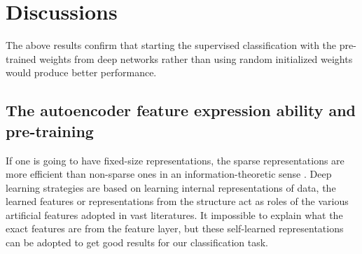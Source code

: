 \documentclass[journal]{IEEEtran}
\begin{document}

\section{Discussions}

The above results confirm that starting the supervised classification with the pre-trained weights from deep networks rather than using random initialized weights would produce better performance.

\subsection{The autoencoder feature expression ability and pre-training}
If one is going to have fixed-size representations, the sparse representations are more efficient than non-sparse ones in an information-theoretic sense \cite{hinton}. 
Deep learning strategies are based on learning internal representations of data, the learned features or representations from the structure act as roles of the various artificial features adopted in vast literatures. It impossible to explain what the exact features are from the feature layer, but these self-learned representations can be adopted to get good results for our classification task. 

\end{document}
